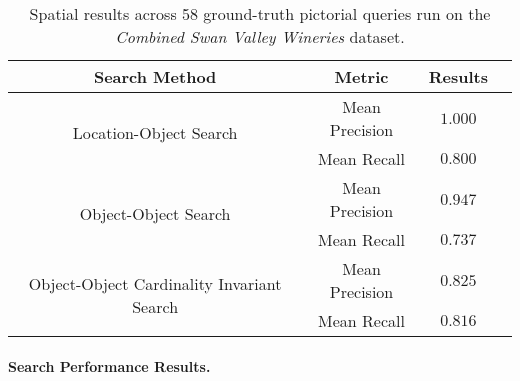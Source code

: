 \small{
\begin{table}[h!]
    \begin{center}
        \begin{tabular}{ |c|c|c|c| } 
            \hline
            Search Method & Metric & Results \\
            \hline
            \multirow{2}{18em}{Location-Object Search} & Mean Precision & $1.000$ \\
            & Mean Recall & $0.800$\\%
            \hline     
            \multirow{2}{18em}{Object-Object Search} & Mean Precision & $0.947$ \\ 
            &Mean Recall & $0.737$ \\
            \hline
            \multirow{2}{18em}{Object-Object Cardinality Invariant Search} & Mean Precision & $0.825$ \\ 
            &Mean Recall & $0.816$ \\
            \hline
        \end{tabular}
        \caption{Spatial results across 58 ground-truth pictorial queries run on the \textit{Combined Swan Valley Wineries} dataset.} %
        \label{Table:GroundTruth}
    \end{center}
    \vspace{-20pt}
\end{table}
}

\paragraph{Search Performance Results.}


